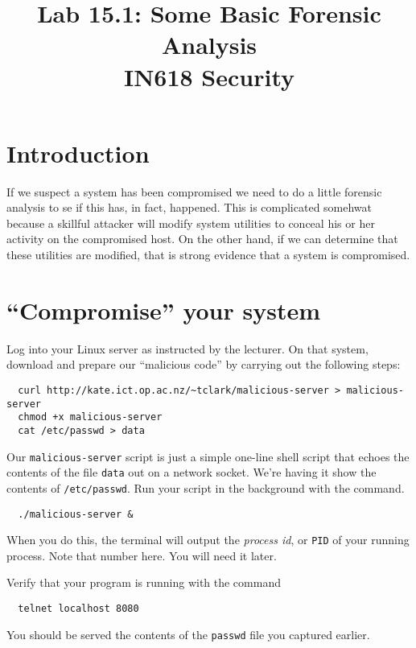 \documentclass{article}
\begin{document}
\title{ Lab 15.1: Some Basic Forensic Analysis \\ IN618 Security}
\maketitle

\section*{Introduction}
If we suspect a system has been compromised we need to do a little forensic analysis to se if this has, in fact, happened.  This is complicated somehwat because a skillful attacker will modify system utilities to conceal his or her activity on the compromised host. On the other hand, if we can determine that these utilities are modified, that is strong evidence that a system is compromised.

\section{``Compromise'' your system}  
Log into your Linux server as instructed by the lecturer.  On that system, download and prepare our ``malicious code'' by carrying out the following steps:

\begin{verbatim}
  curl http://kate.ict.op.ac.nz/~tclark/malicious-server > malicious-server
  chmod +x malicious-server
  cat /etc/passwd > data
\end{verbatim}

Our \texttt{malicious-server} script is just a simple one-line shell script that echoes the contents of the file \texttt{data} out on a network socket. We're having it show the contents of \texttt{/etc/passwd}. Run your script in the background with the command.

\begin{verbatim}
  ./malicious-server &
\end{verbatim}

When you do this, the terminal will output the \emph{process id}, or \texttt{PID} of your running process.  Note that number here.  You will need it later.

Verify that your program is running with the command

\begin{verbatim}
  telnet localhost 8080
\end{verbatim}

You should be served the contents of the \texttt{passwd} file you captured earlier. 
\end{document}
